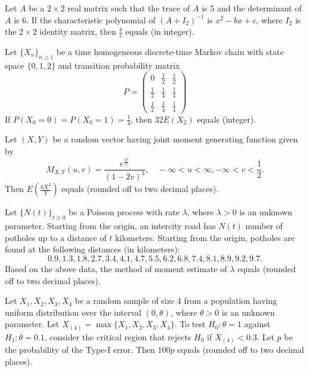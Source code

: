     \item Let $A$ be a $2 \times 2$ real matrix such that the trace of $A$ is 5 and the determinant of $A$ is 6. If the characteristic polynomial of $(A + I_2)^{-1}$ is $x^2 - bx + c$, where $I_2$ is the $2 \times 2$ identity matrix, then $\frac{b}{c}$ equals {\underline{\hspace{2cm}}} (in integer).
    \item Let $\{X_n\}_{n \geq 1}$ be a time homogeneous discrete-time Markov chain with state space $\{0, 1, 2\}$ and transition probability matrix
\[
    P = \begin{pmatrix}
        0 & \frac{1}{2} & \frac{1}{2} \\
        \frac{1}{2} & \frac{1}{4} & \frac{1}{4} \\
        \frac{1}{2} & \frac{1}{4} & \frac{1}{4}
    \end{pmatrix}
\]
    If $P(X_0 = 0) = P(X_0 = 1) = \frac{1}{4}$, then $32 E(X_2)$ equals  {\underline{\hspace{2cm}}}  (integer).
    \item Let $(X, Y)$ be a random vector having joint moment generating function given by
    $$M_{X,Y}(u, v) = \frac{e^{\frac{u^2}{2}}}{(1 - 2v)^3}, \quad -\infty < u < \infty, -\infty < v < \frac{1}{2}.$$
    Then $E(\frac{6X^2}{Y})$ equals {\underline{\hspace{2cm}}} (rounded off to two decimal places).

    \item Let $\{N(t)\}_{t \geq 0}$ be a Poisson process with rate $\lambda$, where $\lambda > 0$ is an unknown parameter. Starting from the origin, an intercity road has $N(t)$ number of potholes up to a distance of $t$ kilometers. Starting from the origin, potholes are found at the following distances (in kilometers):
\[
    0.9, 1.3, 1.8, 2.7, 3.4, 4.1, 4.7, 5.5, 6.2, 6.8, 7.4, 8.1, 8.9, 9.2, 9.7.
\]
    Based on the above data, the method of moment estimate of $\lambda$ equals  {\underline{\hspace{2cm}}} (rounded off to two decimal places).

    \item Let $X_1, X_2, X_3, X_4$ be a random sample of size 4 from a population having uniform distribution over the interval $(0, \theta)$, where $\theta > 0$ is an unknown parameter. Let $X_{(4)} = \max\{X_1, X_2, X_3, X_4\}$. To test $H_0: \theta = 1$ against $H_1: \theta = 0.1$, consider the critical region that rejects $H_0$ if $X_{(4)} < 0.3$. Let $p$ be the probability of the Type-I error. Then $100p$ equals  {\underline{\hspace{2cm}}} (rounded off to two decimal places).

